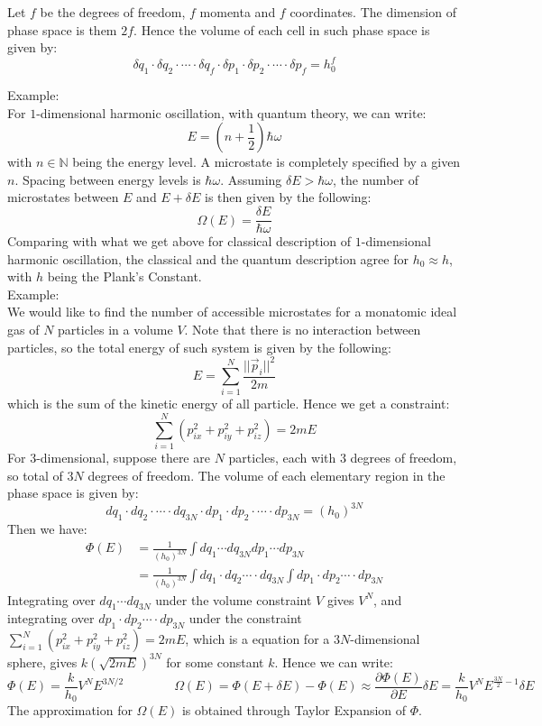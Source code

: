 \documentclass[11pt,oneside]{book}
\theoremstyle{break}
\theoremstyle{break}
\newcommand{\N}{\mathbb{N}}
\newcommand{\example}{\color{green}Example: \color{black}}
\begin{document}
\hfill\break
Let $f$ be the degrees of freedom, $f$ momenta and $f$ coordinates. The dimension of phase space is them $2f$. Hence the volume of each cell in such phase space is given by: $$\delta q_1 \cdot \delta q_2 \cdot \cdots \cdot \delta q_f \cdot \delta p_1 \cdot \delta p_2\cdot \cdots \cdot \delta p_f = h_0^f$$


\example\\
For $1$-dimensional harmonic oscillation, with quantum theory, we can write:
$$E = \left(n+\frac{1}{2}\right) \hbar \omega$$
with $n\in \N$ being the energy level. A microstate is completely specified by a given $n$. Spacing between energy levels is $\hbar \omega$. Assuming $\delta E > \hbar \omega$, the number of microstates between $E$ and $E+ \delta E$ is then given by the following: 
$$\Omega(E) = \frac{\delta E}{\hbar \omega}$$
Comparing with what we get above for classical description of $1$-dimensional harmonic oscillation, the classical and the quantum description agree for $h_0 \approx h$, with $h$ being the Plank's Constant. \\


\example\\
We would like to find the number of accessible microstates for a monatomic ideal gas of $N$ particles in a volume $V$. Note that there is no interaction between particles, so the total energy of such system is given by the following:
$$E = \sum_{i=1}^N \frac{||\vec{p}_i||^2}{2m}$$ which is the sum of the kinetic energy of all particle. Hence we get a constraint:
$$\sum_{i=1}^N (p_{ix}^2 + p_{iy}^2 + p_{iz}^2) = 2mE$$
For $3$-dimensional, suppose there are $N$ particles, each with $3$ degrees of freedom, so total of $3N$ degrees of freedom. The volume of each elementary region in the phase space is given by:
$$dq_1\cdot dq_2 \cdot \cdots \cdot dq_{3N}\cdot dp_1\cdot dp_2\cdot \cdots \cdot dp_{3N} = (h_0)^{3N}$$
Then we have: 
\begin{align*}
\Phi(E) &= \frac{1}{(h_0)^{3N}}\int dq_{1} \cdots dq_{3N} dp_1 \cdots dp_{3N}\\
&= \frac{1}{(h_0)^{3N}} \int dq_1 \cdot dq_2 \cdots \cdot dq_{3N} \int dp_1 \cdot dp_2 \cdots \cdot dp_{3N}
\end{align*}
Integrating over $dq_{1} \cdots dq_{3N}$ under the volume constraint $V$ gives $V^N$, and integrating over $ dp_1 \cdot dp_2 \cdots \cdot dp_{3N}$ under the constraint $\sum_{i=1}^N (p_{ix}^2 + p_{iy}^2 + p_{iz}^2) = 2mE$, which is a equation for a $3N$-dimensional sphere, gives $k(\sqrt{2mE})^{3N}$ for some constant $k$. Hence we can write:
$$\Phi(E) = \frac{k}{h_0} V^N E^{3N/2} \qquad \qquad \Omega(E) = \Phi(E + \delta E) - \Phi(E) \approx \frac{\partial \Phi(E)}{\partial E} \delta E = \frac{k}{h_0} V^N E^{\frac{3N}{2}-1} \delta E$$
The approximation for $\Omega(E)$ is obtained through Taylor Expansion of $\Phi$. \\
\end{document}

